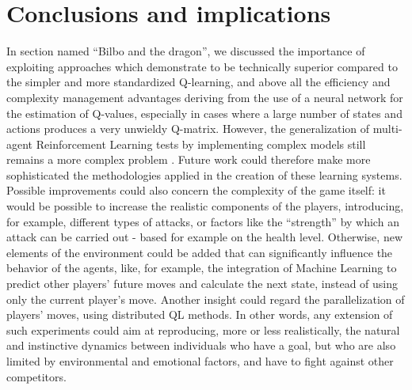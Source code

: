 \section{Conclusions and implications}
In section named ``Bilbo and the dragon'', we discussed the importance of exploiting approaches which demonstrate to be technically superior compared to the simpler and more standardized Q-learning, and above all the efficiency and complexity management advantages deriving from the use of a neural network for the estimation of Q-values, especially in cases where a large number of states and actions produces a very unwieldy Q-matrix. However, the generalization of multi-agent Reinforcement Learning tests by implementing complex models still remains a more complex problem \cite{1}. Future work could therefore make more sophisticated the methodologies applied in the creation of these learning systems.
Possible improvements could also concern the complexity of the game itself: it would be possible to increase the realistic components of the players, introducing, for example, different types of attacks, or factors like the ``strength'' by which an attack can be carried out - based for example on the health level. 
Otherwise, new elements of the environment could be added that can significantly influence the behavior of the agents, like, for example, the integration of Machine Learning to predict other players' future moves and calculate the next state, instead of using only the current player's move. Another insight could regard the parallelization of players' moves, using distributed QL methods\cite{9}.
In other words, any extension of such experiments could aim at reproducing, more or less realistically, the natural and instinctive dynamics between individuals who have a goal, but who are also limited by environmental and emotional factors, and have to fight against other competitors.
\pagebreak
\onecolumn
\nocite{*}





